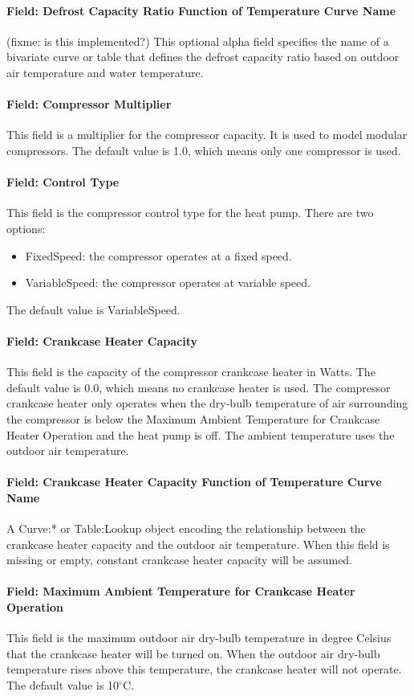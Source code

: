 \paragraph{Field: Defrost Capacity Ratio Function of Temperature Curve Name}
(fixme: is this implemented?) This optional alpha field specifies the name of a
bivariate curve or table that defines the defrost capacity ratio based on
outdoor air temperature and water temperature.
\paragraph{Field: Compressor Multiplier} This field is a multiplier for the
compressor capacity. It is used to model modular compressors. The default value
is 1.0, which means only one compressor is used.
\paragraph{Field: Control Type} This field is the compressor control type for
the heat pump. There are two options:

\begin{itemize}
    \item FixedSpeed: the compressor operates at a fixed speed.
    \item VariableSpeed: the compressor operates at variable speed.
\end{itemize} The default value is VariableSpeed.
\paragraph{Field: Crankcase Heater Capacity} This field is the capacity of the
compressor crankcase heater in Watts. The default value is 0.0, which means no
crankcase heater is used. The compressor crankcase heater only operates when the
dry-bulb temperature of air surrounding the compressor is below the Maximum
Ambient Temperature for Crankcase Heater Operation and the heat pump is off. The
ambient temperature uses the outdoor air temperature.
\paragraph{Field: Crankcase Heater Capacity Function of Temperature Curve Name}
A Curve:* or Table:Lookup object encoding the relationship between the crankcase
heater capacity and the outdoor air temperature. When this field is missing or
empty, constant crankcase heater capacity will be assumed.
\paragraph{Field: Maximum Ambient Temperature for Crankcase Heater Operation}
This field is the maximum outdoor air dry-bulb temperature in degree Celsius
that the crankcase heater will be turned on. When the outdoor air dry-bulb
temperature rises above this temperature, the crankcase heater will not operate.
The default value is 10$^\circ$C.
